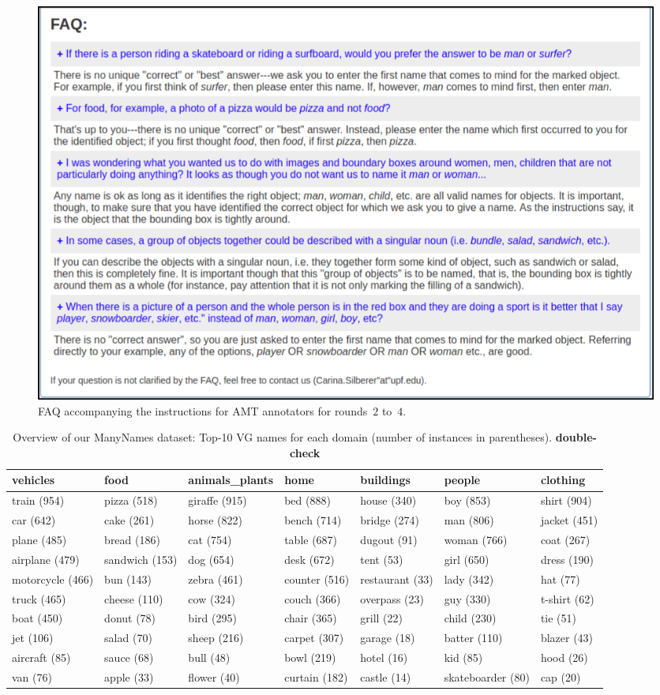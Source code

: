 \documentclass[11pt,a4paper]{article}
\begin{document}
\begin{figure}[htb]
  \centering
  \includegraphics[width=1.5\columnwidth]{figures/round1+_p2.png}
  \caption{FAQ accompanying the instructions for AMT annotators for rounds~$2$ to~$4$.}
  \label{fig:faq}
\end{figure}

\begin{table}
	\small
	\centering
\begin{tabular}{@{~}l@{~}l@{~}l@{~}l@{~}l@{~}l@{~}l}
	\toprule
	          vehicles &            food & animals\_plants &           home &        buildings &             people &      clothing \\
	\midrule
	  train (954) &  pizza (518) &  giraffe (915) &  bed (888) &  house (340) &  boy (853) &  shirt (904) \\
	  car (642) &  cake (261) &  horse (822) &  bench (714) &  bridge (274) &  man (806) &  jacket (451) \\
	  plane (485) &  bread (186) &  cat (754) &  table (687) &  dugout (91) &  woman (766) &  coat (267) \\
	  airplane (479) &  sandwich (153) &  dog (654) &  desk (672) &  tent (53) &  girl (650) &  dress (190) \\
	  motorcycle (466) &  bun (143) &  zebra (461) &  counter (516) &  restaurant (33) &  lady (342) &  hat (77) \\
	  truck (465) &  cheese (110) &  cow (324) &  couch (366) &  overpass (23) &  guy (330) &  t-shirt (62) \\
	 boat (450) &  donut (78) &  bird (295) &  chair (365) &  grill (22) &  child (230) &  tie (51) \\
	  jet (106) &  salad (70) &  sheep (216) &  carpet (307) &  garage (18) &  batter (110) &  blazer (43) \\
	  aircraft (85) &  sauce (68) &  bull (48) &  bowl (219) &  hotel (16) &  kid (85) &  hood (26) \\
	  van (76) &  apple (33) &  flower (40) &  curtain (182) &  castle (14) &  skateboarder (80) &  cap (20) \\
	\bottomrule
\end{tabular}
	\caption{Overview of our ManyNames dataset: Top-10 VG names for each domain (number of instances in parentheses). \textbf{double-check} \label{tab:overview_dataset1}}
\end{table}
\end{document}
